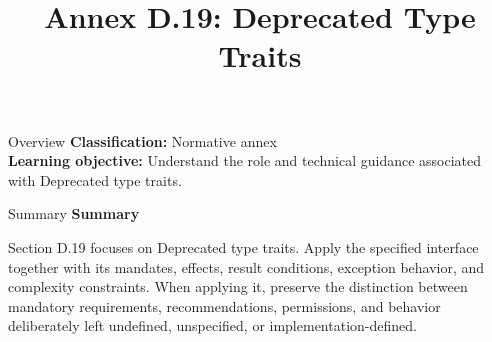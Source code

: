 \documentclass[10pt,letterpaper]{article}
\title{Annex D.19: Deprecated Type Traits}
\author{}
\date{}
\begin{document}
\maketitle
\begin{CornellOverviewBox}{Overview}
\textbf{Classification:} Normative annex\\[2pt]
\textbf{Learning objective:} Understand the role and technical guidance associated with Deprecated type traits.
\end{CornellOverviewBox}\begin{CornellSummaryBox}{Summary}
{\sffamily\bfseries\color{Accent} Summary}\par\vspace{3pt}Section D.19 focuses on Deprecated type traits. Apply the specified interface together with its mandates, effects, result conditions, exception behavior, and complexity constraints. When applying it, preserve the distinction between mandatory requirements, recommendations, permissions, and behavior deliberately left undefined, unspecified, or implementation-defined.
\end{CornellSummaryBox}
\end{document}
